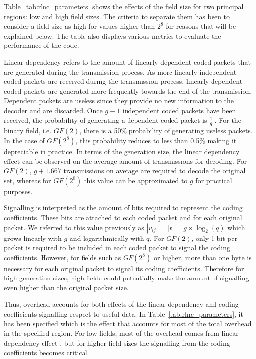 Table~\ref{tab:rlnc_parameters} shows the effects of the field size for two principal regions: low and high field sizes. The criteria to separate them has been to consider a field size as high for values higher than $2^8$ for reasons that will be explained below. The table also displays various metrics to evaluate the performance of the code.

Linear dependency refers to the amount of linearly dependent coded packets that are generated during the transmission process. As more linearly independent coded packets are received during the transmission process, linearly dependent coded packets are generated more frequently towards the end of the transmission. Dependent packets are useless since they provide no new information to the decoder and are discarded. Once $g - 1$ independent coded packets have been received, the probability of generating a dependent coded packet is $\frac{1}{q}$ \cite{lucani2009random,heide2011code}. For the binary field, i.e. $GF(2)$, there is a 50\% probability of generating useless packets. In the case of $GF(2^8)$, this probability reduces to less than 0.5\% making it depreciable in practice. In terms of the generation size, the linear dependency effect can be observed on the average amount of transmissions for decoding. For $GF(2)$, $g + 1.667$ transmissions on average are required to decode the original set, whereas for $GF(2^8)$ this value can be approximated to $g$ for practical purposes. 

Signalling is interpreted as the amount of bits required to represent the coding coefficients. These bits are attached to each coded packet and for each original packet. We referred to this value previously as $|v_{ij}| = |v| = g \times \log_{2}(q)$ which grows linearly with $g$ and logarithmically with $q$. For $GF(2)$, only 1 bit per packet is required to be included in each coded packet to signal the coding coefficients. However, for fields such as $GF(2^8)$ or higher, more than one byte is necessary for each original packet to signal its coding coefficients. Therefore for high generation sizes, high fields could potentially make the amount of signalling even higher than the original packet size.

Thus, overhead accounts for both effects of the linear dependency and coding coefficients signalling respect to useful data. In Table~\ref{tab:rlnc_parameters}, it has been specified which is the effect that accounts for most of the total overhead in the specified region. For low fields, most of the overhead comes from linear dependency effect , but for higher field sizes the signalling from the coding coefficients becomes critical. 

